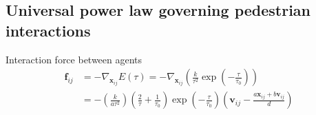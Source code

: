 \subsection{Universal power law governing pedestrian interactions}
Interaction force between agents
\begin{align}
\mathbf{f}_{ij}^{} &= -\nabla_{\mathbf{x}_{ij}} E(\tau) 
= -\nabla_{\mathbf{x}_{ij}} \left(\frac{k}{\tau^{2}} \exp \left( -\frac{\tau}{\tau_{0}} \right) \right) \\
&= - \left(\frac{k}{a \tau^{2}}\right) 
\left(\frac{2}{\tau} + \frac{1}{\tau_{0}}\right) 
\exp\left (-\frac{\tau}{\tau_{0}}\right )
\left(\mathbf{v}_{ij} -\frac{a \mathbf{x}_{ij} + b \mathbf{v}_{ij}}{d} \right) 
\end{align}



